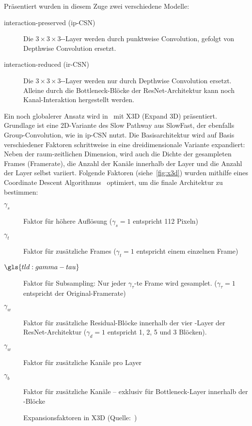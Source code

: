 Präsentiert wurden in diesem Zuge zwei verschiedene Modelle:
\begin{description}
    \item[interaction-preserved (ip-CSN)] Die $3 \times 3 \times 3$-\conv-Layer werden durch punktweise Convolution, gefolgt von Depthwise Convolution ersetzt.
    \item[interaction-reduced (ir-CSN)]  Die $3 \times 3 \times 3$-\conv-Layer werden nur durch Depthwise Convolution ersetzt.
    Alleine durch die Bottleneck-Blöcke der ResNet-Architektur kann noch Kanal-Interaktion hergestellt werden.
\end{description}

Ein noch globalerer Ansatz wird in~\cite{Feichtenhofer20} mit X3D (Expand 3D) präsentiert.
Grundlage ist eine 2D-Variante des Slow Pathway aus SlowFast, der ebenfalls Group-Convolution, wie in ip-CSN nutzt.
Die Basisarchitektur wird auf Basis verschiedener Faktoren schrittweise in eine dreidimensionale Variante expandiert:
Neben der raum-zeitlichen Dimension, wird auch die Dichte der gesampleten Frames (Framerate), die Anzahl der Kanäle innerhalb der Layer und die Anzahl der Layer selbst variiert.
Folgende Faktoren (siehe~\autoref{fig:x3d}) wurden mithilfe eines Coordinate Descent Algorithmus~\cite{Wright15} optimiert, um die finale Architektur zu bestimmen:

\begin{description}
    \item[$\gamma_s$] Faktor für höhere Auflösung ($\gamma_s = 1$ entspricht 112 Pixeln)
    \item[$\gamma_t$] Faktor für zusätzliche Frames ($\gamma_t = 1$ entspricht einem einzelnen Frame)
    \item[$\gls{tld:gamma-tau}$] Faktor für Subsampling: Nur jeder $\gamma_\tau$-te Frame wird gesamplet. ($\gamma_\tau = 1$ entspricht der Original-Framerate)
    \item[$\gamma_w$] Faktor für zusätzliche Residual-Blöcke innerhalb der vier \res-Layer der ResNet-Architektur ($\gamma_d = 1$ entspricht 1, 2, 5 und 3 Blöcken).
    \item[$\gamma_w$] Faktor für zusätzliche Kanäle pro Layer
    \item[$\gamma_b$] Faktor für zusätzliche Kanäle -- exklusiv für Bottleneck-Layer innerhalb der \res-Blöcke
\end{description}

\begin{figure}[h!]
    \centering
    \caption{Expansionsfaktoren in X3D (Quelle:~\cite{Feichtenhofer20})}
    \label{fig:x3d}
\end{figure}

